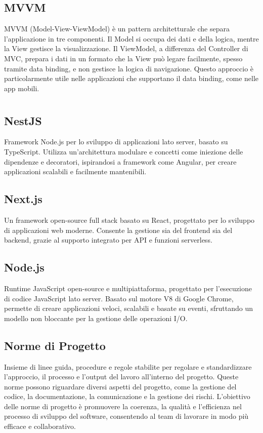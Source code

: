 \hypertarget{sec:MVVM}{}
\subsection*{MVVM}
MVVM (Model-View-ViewModel) è un pattern architetturale che separa l'applicazione in tre componenti. 
Il Model si occupa dei dati e della logica, mentre la View gestisce la visualizzazione. 
Il ViewModel, a differenza del Controller di MVC, prepara i dati in un formato che la View può legare facilmente, spesso tramite data binding, e non gestisce la logica di navigazione. 
Questo approccio è particolarmente utile nelle applicazioni che supportano il data binding, come nelle app mobili.
\newpage



\section{}

\hypertarget{sec:nestjs}{}
\subsection*{NestJS}
Framework Node.js per lo sviluppo di applicazioni lato server, basato su TypeScript. Utilizza un'architettura modulare e concetti come iniezione delle 
dipendenze e decoratori, ispirandosi a framework come Angular, per creare applicazioni scalabili e facilmente mantenibili.

\hypertarget{sec:nextjs}{}
\subsection*{Next.js}
Un framework open-source full stack basato su React, progettato per lo sviluppo di applicazioni web moderne. Consente la gestione sia del frontend sia 
del backend, grazie al supporto integrato per API e funzioni serverless.

\hypertarget{sec:nodejs}{}
\subsection*{Node.js}
Runtime JavaScript open-source e multipiattaforma, progettato per l'esecuzione di codice JavaScript lato server. Basato sul motore V8 di Google Chrome, 
permette di creare applicazioni veloci, scalabili e basate su eventi, sfruttando un modello non bloccante per la gestione delle operazioni I/O.

\subsection*{Norme di Progetto}
Insieme di linee guida, procedure e regole stabilite per regolare e standardizzare l’approccio, il processo e l’output del lavoro all’interno del progetto. 
Queste norme possono riguardare diversi aspetti del progetto, come la gestione del codice, la documentazione, la comunicazione e la gestione dei rischi. 
L’obiettivo delle norme di progetto è promuovere la coerenza, la qualità e l’efficienza nel processo di sviluppo del software, consentendo al team di 
lavorare in modo più efficace e collaborativo.

